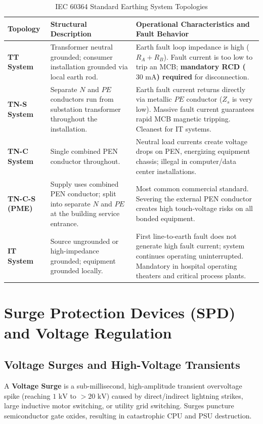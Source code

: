 \begin{table}[htbp]
\centering
\small
\caption{IEC 60364 Standard Earthing System Topologies}
\label{tab:iec_earthing_systems}
\begin{tabularx}{\textwidth}{l X X}
\toprule
\textbf{Topology} & \textbf{Structural Description} & \textbf{Operational Characteristics and Fault Behavior} \\
\midrule
\textbf{TT System} & Transformer neutral grounded; consumer installation grounded via local earth rod. & Earth fault loop impedance is high ($R_A + R_B$). Fault current is too low to trip an MCB; \textbf{mandatory RCD ($30\text{ mA}$) required} for disconnection. \\
\textbf{TN-S System} & Separate $N$ and $PE$ conductors run from substation transformer throughout the installation. & Earth fault current returns directly via metallic $PE$ conductor ($Z_s$ is very low). Massive fault current guarantees rapid MCB magnetic tripping. Cleanest for IT systems. \\
\textbf{TN-C System} & Single combined PEN conductor throughout. & Neutral load currents create voltage drops on PEN, energizing equipment chassis; illegal in computer/data center installations. \\
\textbf{TN-C-S (PME)} & Supply uses combined PEN conductor; split into separate $N$ and $PE$ at the building service entrance. & Most common commercial standard. Severing the external PEN conductor creates high touch-voltage risks on all bonded equipment. \\
\textbf{IT System} & Source ungrounded or high-impedance grounded; equipment grounded locally. & First line-to-earth fault does not generate high fault current; system continues operating uninterrupted. Mandatory in hospital operating theaters and critical process plants. \\
\bottomrule
\end{tabularx}
\end{table}


\section{Surge Protection Devices (SPD) and Voltage Regulation}
\label{sec:surge_protection}

\subsection{Voltage Surges and High-Voltage Transients}
A \textbf{Voltage Surge} is a sub-millisecond, high-amplitude transient overvoltage spike (reaching $1\text{ kV}$ to $>20\text{ kV}$) caused by direct/indirect lightning strikes, large inductive motor switching, or utility grid switching. Surges puncture semiconductor gate oxides, resulting in catastrophic CPU and PSU destruction.

